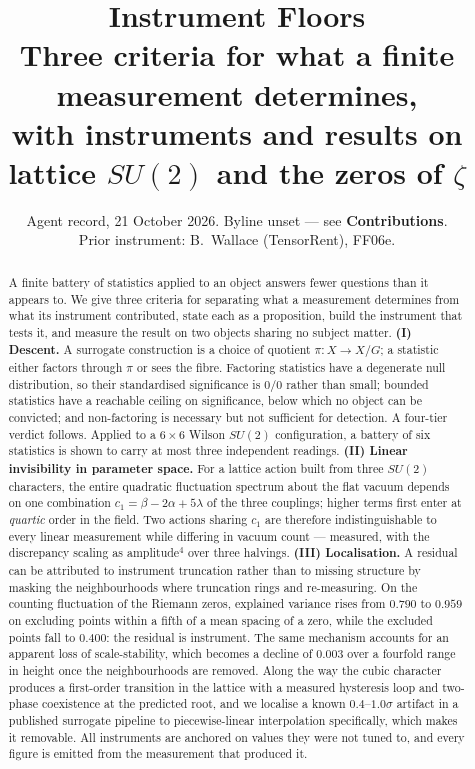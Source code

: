 \documentclass[11pt]{article}
\title{\textbf{Instrument Floors}\\[3pt]
\large Three criteria for what a finite measurement determines,\\
with instruments and results on lattice $SU(2)$ and the zeros of $\zeta$}
\author{\small Agent record, 21 October 2026. Byline unset --- see \textbf{Contributions}.\\
\small Prior instrument: B.\ Wallace (TensorRent), FF06e.}
\date{}
\theoremstyle{remark}
\begin{document}
\maketitle

\begin{abstract}
A finite battery of statistics applied to an object answers fewer questions than it
appears to. We give three criteria for separating what a measurement determines from
what its instrument contributed, state each as a proposition, build the instrument that
tests it, and measure the result on two objects sharing no subject matter. \textbf{(I)
Descent.} A surrogate construction is a choice of quotient $\pi\colon X\to X/G$; a
statistic either factors through $\pi$ or sees the fibre. Factoring statistics have a
degenerate null distribution, so their standardised significance is $0/0$ rather than
small; bounded statistics have a reachable ceiling on significance, below which no
object can be convicted; and non-factoring is necessary but not sufficient for
detection. A four-tier verdict follows. Applied to a $6\times6$ Wilson $SU(2)$
configuration, a battery of six statistics is shown to carry at most three independent
readings. \textbf{(II) Linear invisibility in parameter space.} For a lattice action
built from three $SU(2)$ characters, the entire quadratic fluctuation spectrum about
the flat vacuum depends on one combination $c_1=\beta-2\alpha+5\lambda$ of the three
couplings; higher terms first enter at \emph{quartic} order in the field. Two actions
sharing $c_1$ are therefore indistinguishable to every linear measurement while
differing in vacuum count --- measured, with the discrepancy scaling as amplitude$^4$
over three halvings. \textbf{(III) Localisation.} A residual can be attributed to
instrument truncation rather than to missing structure by masking the neighbourhoods
where truncation rings and re-measuring. On the counting fluctuation of the Riemann
zeros, explained variance rises from $0.790$ to $0.959$ on excluding points within a
fifth of a mean spacing of a zero, while the excluded points fall to $0.400$: the
residual is instrument. The same mechanism accounts for an apparent loss of
scale-stability, which becomes a decline of $0.003$ over a fourfold range in height
once the neighbourhoods are removed. Along the way the cubic character produces a
first-order transition in the lattice with a measured hysteresis loop and two-phase
coexistence at the predicted root, and we localise a known $0.4$--$1.0\sigma$ artifact
in a published surrogate pipeline to piecewise-linear interpolation specifically, which
makes it removable. All instruments are anchored on values they were not tuned to, and
every figure is emitted from the measurement that produced it.
\end{abstract}
\end{document}
